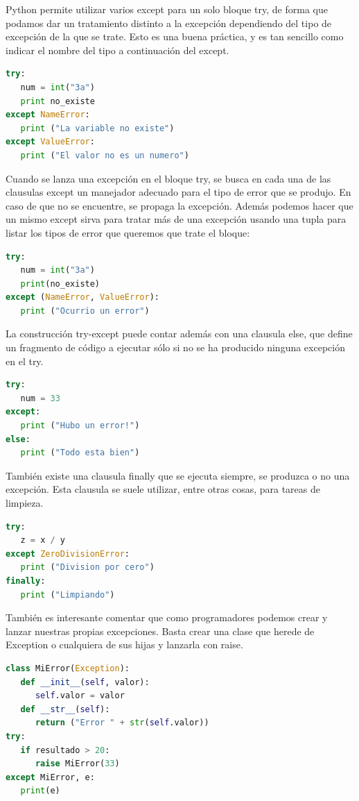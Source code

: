 \documentclass[12pt, twoside]{report}
\begin{document}
Python permite utilizar varios except para un solo bloque try, de forma que podamos dar un tratamiento distinto a la excepción dependiendo del tipo de excepción de la que se trate. Esto es una buena práctica, y es tan sencillo como indicar el nombre del tipo a continuación del except.

\begin{lstlisting}[language=Python]
try:
   num = int("3a")
   print no_existe
except NameError:
   print ("La variable no existe")
except ValueError:
   print ("El valor no es un numero")
\end{lstlisting}

Cuando se lanza una excepción en el bloque try, se busca en cada una de las clausulas except un manejador adecuado para el tipo de error que se produjo. En caso de que no se encuentre, se propaga la excepción.
Además podemos hacer que un mismo except sirva para tratar más de una excepción usando una tupla para listar los tipos de error que queremos que trate el bloque:

\begin{lstlisting}[language=Python]
try:
   num = int("3a")
   print(no_existe)
except (NameError, ValueError):
   print ("Ocurrio un error")
\end{lstlisting}

La construcción try-except puede contar además con una clausula else, que define un fragmento de código a ejecutar sólo si no se ha producido ninguna excepción en el try.

\begin{lstlisting}[language=Python]
try:
   num = 33
except:
   print ("Hubo un error!")
else:
   print ("Todo esta bien")
\end{lstlisting}

También existe una clausula finally que se ejecuta siempre, se produzca o no una excepción. Esta clausula se suele utilizar, entre otras cosas, para tareas de limpieza.

\begin{lstlisting}[language=Python]
try:
   z = x / y
except ZeroDivisionError:
   print ("Division por cero")
finally:
   print ("Limpiando")
\end{lstlisting}


También es interesante comentar que como programadores podemos crear y lanzar nuestras propias excepciones. Basta crear una clase que herede de Exception o cualquiera de sus hijas y lanzarla con raise.


\begin{lstlisting}[language=Python]
class MiError(Exception):
   def __init__(self, valor):
      self.valor = valor
   def __str__(self):
      return ("Error " + str(self.valor))
try:
   if resultado > 20:
      raise MiError(33)
except MiError, e:
   print(e)
\end{lstlisting}
\end{document}

